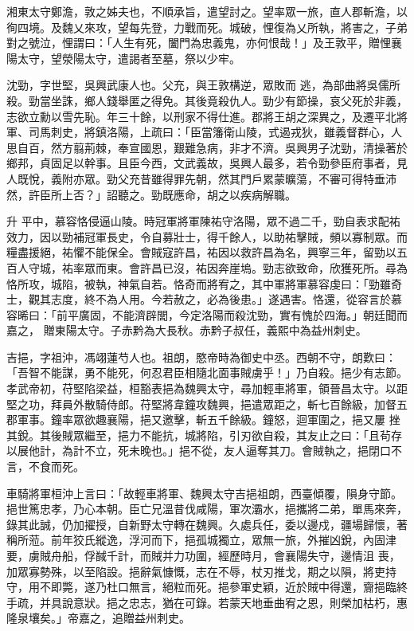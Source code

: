 \begin{pinyinscope}
 湘東太守鄭澹，敦之姊夫也，不順承旨，遣望討之。望率眾一旅，直人郡斬澹，以徇四境。及魏乂來攻，望每先登，力戰而死。城破，悝復為乂所執，將害之，子弟對之號泣，悝謂曰：「人生有死，闔門為忠義鬼，亦何恨哉！」及王敦平，贈悝襄陽太守，望滎陽太守，遣謁者至墓，祭以少牢。



 沈勁，字世堅，吳興武康人也。父充，與王敦構逆，眾敗而
 逃，為部曲將吳儒所殺。勁當坐誅，鄉人錢舉匿之得免。其後竟殺仇人。勁少有節操，哀父死於非義，志欲立勳以雪先恥。年三十餘，以刑家不得仕進。郡將王胡之深異之，及遷平北將軍、司馬刺史，將鎮洛陽，上疏曰：「臣當籓衛山陵，式遏戎狄，雖義督群心，人思自百，然方翦荊棘，奉宣國恩，艱難急病，非才不濟。吳興男子沈勁，清操著於鄉邦，貞固足以幹事。且臣今西，文武義故，吳興人最多，若令勁參臣府事者，見人既悅，義附亦眾。勁父充昔雖得罪先朝，然其門戶累蒙曠蕩，不審可得特垂沛然，許臣所上否？」詔聽之。勁既應命，胡之以疾病解職。



 升
 平中，慕容恪侵逼山陵。時冠軍將軍陳祐守洛陽，眾不過二千，勁自表求配祐效力，因以勁補冠軍長史，令自募壯士，得千餘人，以助祐擊賊，頻以寡制眾。而糧盡援絕，祐懼不能保全。會賊寇許昌，祐因以救許昌為名，興寧三年，留勁以五百人守城，祐率眾而東。會許昌已沒，祐因奔崖塢。勁志欲致命，欣獲死所。尋為恪所攻，城陷，被執，神氣自若。恪奇而將宥之，其中軍將軍慕容虔曰：「勁雖奇士，觀其志度，終不為人用。今若赦之，必為後患。」遂遇害。恪還，從容言於慕容晞曰：「前平廣固，不能濟辟閭，今定洛陽而殺沈勁，實有愧於四海。」朝廷聞而嘉之，
 贈東陽太守。子赤黔為大長秋。赤黔子叔任，義熙中為益州刺史。



 吉挹，字祖沖，馮翊蓮芍人也。祖朗，愍帝時為御史中丞。西朝不守，朗歎曰：「吾智不能謀，勇不能死，何忍君臣相隨北面事賊虜乎！」乃自殺。挹少有志節。孝武帝初，苻堅陷梁益，桓豁表挹為魏興太守，尋加輕車將軍，領晉昌太守。以距堅之功，拜員外散騎侍郎。苻堅將韋鐘攻魏興，挹遣眾距之，斬七百餘級，加督五郡軍事。鐘率眾欲趣襄陽，挹又邀擊，斬五千餘級。鐘怒，迴軍圍之，挹又屢
 挫其銳。其後賊眾繼至，挹力不能抗，城將陷，引刃欲自殺，其友止之曰：「且茍存以展他計，為計不立，死未晚也。」挹不從，友人逼奪其刀。會賊執之，挹閉口不言，不食而死。



 車騎將軍桓沖上言曰：「故輕車將軍、魏興太守吉挹祖朗，西臺傾覆，隕身守節。挹世篤忠孝，乃心本朝。臣亡兄溫昔伐咸陽，軍次灞水，挹攜將二弟，單馬來奔，錄其此誠，仍加擢授，自新野太守轉在魏興。久處兵任，委以邊戍，疆場歸懷，著稱所蒞。前年狡氏縱逸，浮河而下，挹孤城獨立，眾無一旅，外摧凶銳，內固津要，虜賊舟船，俘馘千計，而賊并力功圍，經歷時月，會襄陽失守，邊情沮
 喪，加眾寡勢殊，以至陷設。挹辭氣慷慨，志在不辱，杖刃推戈，期之以隕，將吏持守，用不即斃，遂乃杜口無言，絕粒而死。挹參軍史穎，近於賊中得還，齎挹臨終手疏，并具說意狀。挹之忠志，猶在可錄。若蒙天地垂曲宥之恩，則榮加枯朽，惠隆泉壤矣。」帝嘉之，追贈益州刺史。




\end{pinyinscope}
